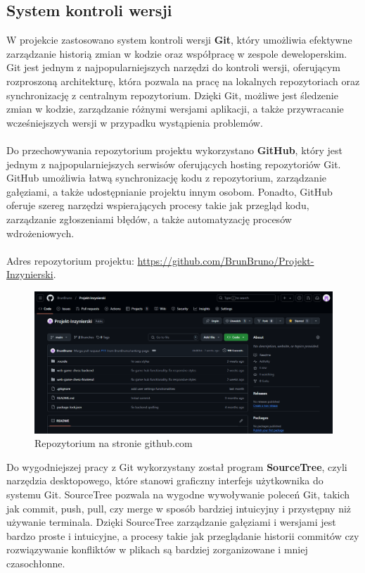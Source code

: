 \documentclass[12pt,a4paper]{article}
\begin{document}
\subsection{System kontroli wersji}

W projekcie zastosowano system kontroli wersji \textbf{Git}, który umożliwia efektywne zarządzanie historią zmian w kodzie oraz współpracę w zespole deweloperskim. Git jest jednym z najpopularniejszych narzędzi do kontroli wersji, oferującym rozproszoną architekturę, która pozwala na pracę na lokalnych repozytoriach oraz synchronizację z centralnym repozytorium. Dzięki Git, możliwe jest śledzenie zmian w kodzie, zarządzanie różnymi wersjami aplikacji, a także przywracanie wcześniejszych wersji w przypadku wystąpienia problemów.
\\\\
Do przechowywania repozytorium projektu wykorzystano  \textbf{GitHub}, który jest jednym z najpopularniejszych serwisów oferujących hosting repozytoriów Git. GitHub umożliwia łatwą synchronizację kodu z repozytorium, zarządzanie gałęziami, a także udostępnianie projektu innym osobom. Ponadto, GitHub oferuje szereg narzędzi wspierających procesy takie jak przegląd kodu, zarządzanie zgłoszeniami błędów, a także automatyzację procesów wdrożeniowych.
\\\\
Adres repozytorium projektu: \href{https://github.com/BrunBruno/Projekt-Inzynierski}{https://github.com/BrunBruno/Projekt-Inzynierski}.

\vspace{1cm}
\begin{figure}[h!]
    \centering
    \includegraphics[width=1\textwidth]{images/gh_repo.png}
    \caption{Repozytorium na stronie github.com}
\end{figure}
\vspace{1cm}

\noindent 
Do wygodniejszej pracy z Git wykorzystany został program  \textbf{SourceTree}, czyli narzędzia desktopowego, które stanowi graficzny interfejs użytkownika do systemu Git. SourceTree pozwala na wygodne wywoływanie poleceń Git, takich jak commit, push, pull, czy merge w sposób bardziej intuicyjny i przystępny niż używanie terminala. Dzięki SourceTree zarządzanie gałęziami i wersjami jest bardzo proste i intuicyjne, a procesy takie jak przeglądanie historii commitów czy rozwiązywanie konfliktów w plikach są bardziej zorganizowane i mniej czasochłonne.
\end{document}
